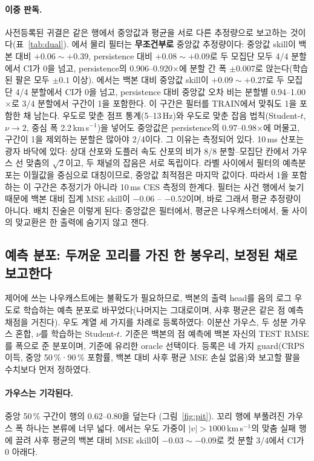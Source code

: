 \documentclass[10pt,a4paper]{article}
\begin{document}
\paragraph{이중 판독.} 사전등록된 귀결은 같은 행에서 중앙값과 평균을 서로 다른
추정량으로 보고하는 것이다(표~\ref{tab:dual}). \Ti{}에서 물리 필터는
\textbf{무조건부로} 중앙값 추정량이다: 중앙값 skill이 백본 대비 $+0.06\sim+0.39$,
persistence 대비 $+0.08\sim+0.09$로 두 모집단 모두 4/4 분할에서 CI가 0을 넘고,
persistence의 0.906--0.920$\times$에 분할 간 폭 $\pm0.007$로
앉는다(학습된 팔은 모두 $\pm0.1$ 이상). \Vrot{}에서는 백본 대비 중앙값 skill이
$+0.09\sim+0.27$로 두 모집단 4/4 분할에서 CI가 0을 넘고, persistence 대비 중앙값
오차 비는 분할별 0.94--1.00$\times$로 3/4 분할에서 구간이 1을 포함한다. 이 구간은
필터를 TRAIN에서 맞춰도 1을 포함한 채 남는다. 우도로 맞춘 점프
통계(5--13\,Hz)와 우도로 맞춘 잡음 법칙(Student-$t$, $\nu\to2$, 중심 폭
2.2\,km\,s$^{-1}$)을 넣어도 중앙값은 persistence의 0.97--0.98$\times$에 머물고,
구간이 1을 제외하는 분할은 많아야 2/4이다. 그 이유는 측정되어 있다. 10\,ms 산포는
광자 바닥에 있다: \Ti{} 상대 산포와 도플러 속도 산포의 비가 8/8 분할--모집단
칸에서 가우스 선 맞춤의 $\sqrt2$이고, 두 채널의 잡음은 서로 독립이다. 라벨 사이에서
필터의 예측분포는 이월값을 중심으로 대칭이므로, 중앙값 최적점은 마지막 값이다.
따라서 1을 포함하는 이 구간은 추정기가 아니라 10\,ms CES 측정의 한계다.
필터는 사건 행에서 늦기 때문에 백본 대비 집계 MSE skill이 $-0.06$ --
$-0.52$이며, 바로 그래서 평균 추정량이 아니다. 배치 진술은 이렇게 된다: 중앙값은
필터에서, 평균은 나우캐스터에서, 둘 사이의 맞교환은 한 출력에 숨기지 않고 잰다.

\subsection{예측 분포: 두꺼운 꼬리를 가진 한 봉우리, 보정된 채로 보고한다}
\label{sec:dist}

제어에 쓰는 나우캐스트에는 불확도가 필요하므로, 백본의 출력 head를 음의 로그 우도로
학습하는 예측 분포로 바꾸었다(나머지는 그대로이며, 사후 평균은 같은 점 예측 채점을
거친다). 우도 계열 세 가지를 차례로 등록하였다: 이분산 가우스, 두 성분 가우스 혼합,
$\nu$를 학습하는 Student-$t$. 기준은 백본의 점 예측에 백본 자신의 TEST RMSE를 폭으로
준 분포이며, 기준에 유리한 oracle 선택이다. 등록은 네 가지 guard(CRPS 이득, 중앙
50\,\%·90\,\% 포함률, 백본 대비 사후 평균 MSE 손실 없음)와 보고할 팔을 수치보다 먼저
정하였다.

\paragraph{가우스는 기각된다.} 중앙 50\,\% 구간이 행의 0.62--0.80을 덮는다
(그림~\ref{fig:pit}). 꼬리 행에 부풀려진 가우스 폭 하나는 본류에 너무 넓다.
\Vrot{}에서는 우도 가중이 $|v| > 1000$\,km\,s$^{-1}$의 맞춤 실패 행에 끌려 사후
평균의 백본 대비 MSE skill이 $-0.03\sim-0.09$로 컷 분할 3/4에서 CI가 0 아래다.
\end{document}
